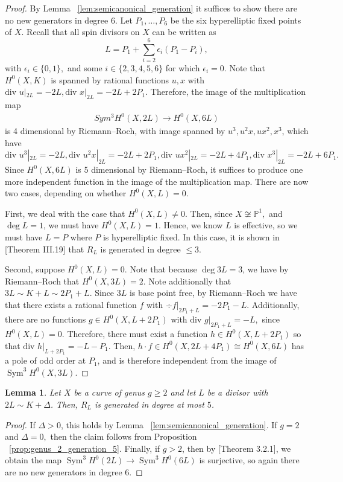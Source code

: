 \documentclass{amsart}
\theoremstyle{plain}
\newtheorem{lem}[thm]{Lemma}
\theoremstyle{definition}
\theoremstyle{remark}
\numberwithin{equation}{section}
\newcommand\BP{{\mathbb P}}
\newcommand \di{\text{div }}
\DeclareMathOperator{\sym}{Sym}
\begin{document}
\begin{proof}
By Lemma ~\ref{lem:semicanonical_generation} it suffices to show there are no new generators in degree 6.
Let $P_1,\ldots, P_6$ be the six hyperelliptic fixed points of $X$. 
Recall that all spin divisors on $X$ can be written as 
$$L = P_1 + \sum_{i=2}^{6} \epsilon_i (P_1 - P_i),$$ 
with $\epsilon_i \in \{0,1\},$ and some $i \in \{2, 3, 4, 5, 6\}$ for which $\epsilon_i = 0$. 
Note that $H^0(X,K)$ is spanned by rational functions $u,x$ with $\di u|_{2L} = -2L, \di x|_{2L} = -2L + 2P_1.$ Therefore, the image of the multiplication map 
\begin{align*}
	Sym^3 H^0(X,2L) \rightarrow H^0(X,6L)
\end{align*}
is 4 dimensional by Riemann--Roch, with image spanned by $u^3,u^2x,ux^2,x^3$, 
which have $\di u^3|_{2L} = -2L, \di u^2x|_{2L} = -2L + 2P_1,\di ux^2|_{2L} = -2L+4P_1, \di x^3|_{2L} = -2L + 6P_1.$ 
Since $H^0(X,6L)$ is 5 dimensional by Riemann--Roch,
it suffices to produce one more independent function in the image of the multiplication map.
There are now two cases, depending on whether $H^0(X,L) = 0$.

First, we deal with the case that $H^0(X,L) \neq 0$. 
Then, since $X \not \cong \BP^1,$ and $\deg L = 1$, we must have $H^0(X,L) = 1$. Hence, we know $L$ is effective, so we must have $L = P$ where $P$ is hyperelliptic fixed. In this case, it is shown in \cite{neves:halfcan}[Theorem III.19] that $R_L$ is generated in degree $\leq 3$.

Second, suppose $H^0(X,L) = 0$.
Note that because $\deg 3L = 3$, we have by Riemann--Roch that $H^0(X,3L) = 2$. 
Note additionally that $3L \sim K + L \sim 2P_1 + L$. Since $3L$ is base point free, by Riemann--Roch
we have that there exists a rational function $f$ with $\div f|_{2P_1 + L} = -2P_1 - L.$ Additionally, there are no functions $g \in H^0(X,L + 2P_1)$ 
with $\di g|_{2P_1 + L} = -L,$ since $H^0(X,L) = 0.$ Therefore, there must 
exist a function $h \in H^0(X,L+2P_1)$ so that $\di h|_{L + 2P_1} = -L - P_1$.
Then, $h \cdot f \in H^0(X,2L + 4P_1) \cong H^0(X,6L)$ has a pole of odd 
order at $P_1$, and is therefore independent from the image of $\sym^3 H^0(X,3L)$.
\end{proof}

\begin{lem}
\label{lem:generation_5}
Let $X$ be a curve of genus $g \geq 2$ and let $L$ be a divisor with $2 L \sim K +\Delta$. Then, $R_L$ is generated in degree at most $5$.
\end{lem}
\begin{proof}
If $\Delta > 0$, this holds by Lemma ~\ref{lem:semicanonical_generation}. If $g = 2$ and $\Delta = 0,$ then the claim follows from
Proposition ~\ref{prop:genus_2_generation_5}. Finally, if $g > 2$, then by \cite{vzb:stacky}[Theorem 3.2.1], we obtain the map $\sym^3 H^0(2L) \rightarrow \sym^3 H^0(6L)$ is surjective, so again there are no new generators in degree 6.
\end{proof}
\end{document}
